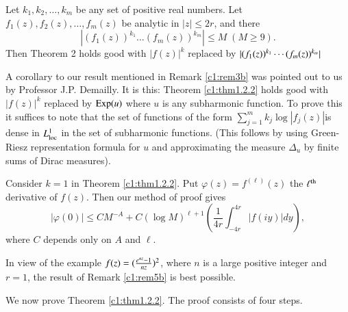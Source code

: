 \begin{remark}\label{c1:rem3b}
Let $k_1, k_2, \ldots, k_m$ be any set of positive real numbers. Let $f_1(z), f_2(z), \ldots, f_m(z)$ be analytic in $|z| \leq 2r$, and there
$$
|(f_1(z))^{k_1} \ldots (f_m(z))^{k_m}| \leq M \; (M\geq 9).
$$
Then Theorem 2 holds good with $|f(z)|^k$ replaced by $|(f_1(z))^{k_1}
\cdots\break(f_m(z))^{k_m}|$ 
\end{remark}

\begin{remark}\label{c1:rem4b}
A corollary to our result mentioned in Remark \ref{c1:rem3b} was pointed out to us by Professor J.P. Demailly. It is this: Theorem \ref{c1:thm1.2.2} holds good with $|f(z)|^k$ replaced by $\operatorname{Exp} (u)$ where $u$ is any subharmonic function. To prove this it suffices to note that the set of functions of the form $\sum\limits^m_{j=1} k_j \log | f_j(z)|$\pageoriginale is dense in $L^1_{\operatorname{loc}}$ in the set of subharmonic functions. (This follows by using Green-Riesz representation formula for $u$ and approximating the measure $\Delta_u$ by finite sums of Dirac measures).
\end{remark}

\begin{remark}\label{c1:rem5b}
Consider $k=1$ in Theorem \ref{c1:thm1.2.2}. Put $\varphi(z) = f^{(\ell)}(z)$ the $\ell^{\rm th}$ derivative of $f(z)$. Then our method of proof gives
$$
|\varphi(0)| \leq C M^{-A} + C (\log M)^{\ell+1} \left( \frac{1}{4r} \int^{4r}_{-4r} |f(iy)| dy\right),
$$
where $C$ depends only on $A$ and $\ell$.
\end{remark}

\begin{remark}\label{c1:rem6b}
In view of the example $f(z) =\break (\frac{e^{nz}-1}{nz})^2$, where $n$ is
a large positive integer and $r=1$, the result of Remark
\ref{c1:rem5b} is best possible. 
\end{remark}

We now prove Theorem \ref{c1:thm1.2.2}. The proof consists of four steps.

